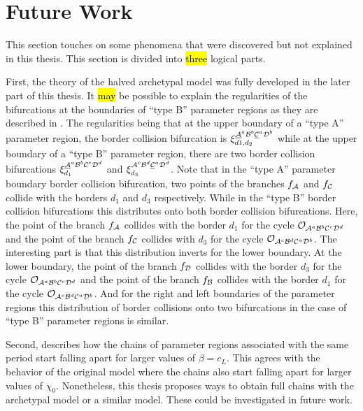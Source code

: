 \section{Future Work}
\label{sec:concl.future}

This section touches on some phenomena that were discovered but not explained in this thesis.
This section is divided into \hl{three} logical parts.

First, the theory of the halved archetypal model was fully developed in the later part of this thesis.
It \hl{may} be possible to explain the regularities of the bifurcations at the boundaries of ``type B'' parameter regions as they are described in .
The regularities being that at the upper boundary of a ``type A'' parameter region, the border collision bifurcation is $\xi_{d1, d_2}^{\underline{\mathcal{A}}^a\mathcal{B}^b\underline{\mathcal{C}}^a\mathcal{D}^b}$ while at the upper boundary of a ``type B'' parameter region, there are two border collision bifurcations $\xi_{d_1}^{\underline{\mathcal{A}}^a\mathcal{B}^b\mathcal{C}^c\mathcal{D}^d}$ and $\xi_{d_3}^{\mathcal{A}^c\mathcal{B}^d\underline{\mathcal{C}}^a\mathcal{D}^d}$.
Note that in the ``type A'' parameter boundary border collision bifurcation, two points of the branches $f_{\mathcal{A}}$ and $f_{\mathcal{C}}$ collide with the borders $d_1$ and $d_3$ respectively.
While in the ``type B'' border collision bifurcations this distributes onto both border collision bifurcations.
Here, the point of the branch $f_{\mathcal{A}}$ collides with the border $d_1$ for the cycle $\mathcal{O}_{\mathcal{A}^a\mathcal{B}^b\mathcal{C}^c\mathcal{D}^d}$ and the point of the branch $f_{\mathcal{C}}$ collides with $d_3$ for the cycle $\mathcal{O}_{\mathcal{A}^c\mathcal{B}^d\mathcal{C}^a\mathcal{D}^b}$.
The interesting part is that this distribution inverts for the lower boundary.
At the lower boundary, the point of the branch $f_{\mathcal{D}}$ collides with the border $d_3$ for the cycle $\mathcal{O}_{\mathcal{A}^a\mathcal{B}^b\mathcal{C}^c\mathcal{D}^d}$ and the point of the branch $f_{\mathcal{B}}$ collides with the border $d_1$ for the cycle $\mathcal{O}_{\mathcal{A}^c\mathcal{B}^d\mathcal{C}^a\mathcal{D}^b}$.
And for the right and left boundaries of the parameter regions this distribution of border collisions onto two bifurcations in the case of ``type B'' parameter regions is similar.

Second,  describes how the chains of parameter regions associated with the same period start falling apart for larger values of $\beta = c_L$.
This agrees with the behavior of the original model where the chains also start falling apart for larger values of $\chi_0$.
Nonetheless, this thesis proposes ways to obtain full chains with the archetypal model or a similar model.
These could be investigated in future work.

